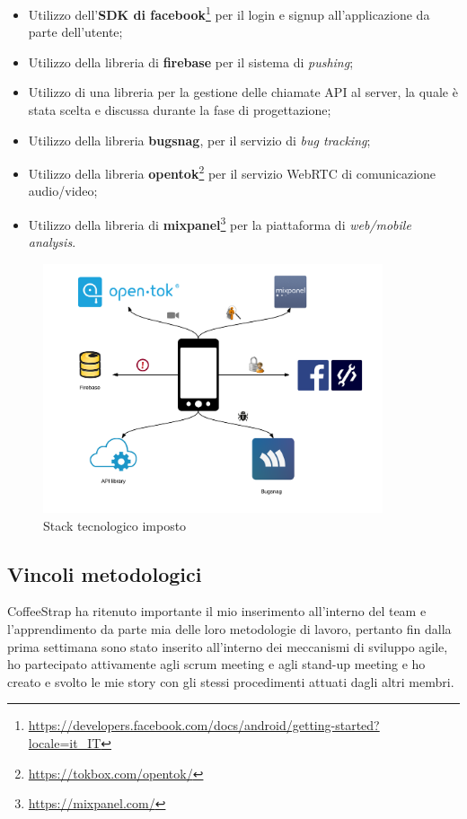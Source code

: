 \begin{itemize}

\item Utilizzo dell'\textbf{SDK di facebook}\footnote{\url{https://developers.facebook.com/docs/android/getting-started?locale=it_IT}} per il login e signup all'applicazione da parte dell'utente;
\item Utilizzo della libreria di \textbf{firebase} per il sistema di \textit{pushing};
\item Utilizzo di una libreria per la gestione delle chiamate API al server, la quale è stata scelta e discussa durante la fase di progettazione;
\item Utilizzo della libreria \textbf{bugsnag}, per il servizio di \textit{bug tracking};
\item Utilizzo della libreria \textbf{opentok}\footnote{\url{https://tokbox.com/opentok/}} per il servizio WebRTC di comunicazione audio/video;
\item Utilizzo della libreria di \textbf{mixpanel}\footnote{\url{https://mixpanel.com/}} per la piattaforma di \textit{web/mobile analysis}.

\end{itemize} 

\begin{figure}[htpd]
\centering
\includegraphics[width=10cm]{../immagini/vincoli-tec}
\caption{Stack tecnologico imposto} 
\end{figure}

\subsection{Vincoli metodologici}

CoffeeStrap ha ritenuto importante il mio inserimento all'interno del team e l'apprendimento da parte mia delle loro metodologie di lavoro, pertanto fin dalla prima settimana sono stato inserito all'interno dei meccanismi di sviluppo agile, ho partecipato attivamente agli scrum meeting e agli stand-up meeting e ho creato e svolto le mie story con gli stessi procedimenti attuati dagli altri membri. 


